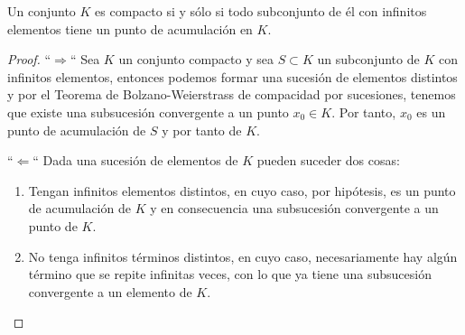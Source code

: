 \begin{teorema}
    Un conjunto $K$ es compacto si y sólo si todo subconjunto de él con infinitos elementos tiene un punto de acumulación en $K$.
\end{teorema}
\begin{proof}
    ``$\Rightarrow$``
    Sea $K$ un conjunto compacto y sea $S \subset K$ un subconjunto de $K$ con infinitos elementos, entonces podemos formar una sucesión de elementos distintos y por el Teorema de Bolzano-Weierstrass de compacidad por sucesiones, tenemos que existe una subsucesión convergente a un punto $x_0 \in K$. Por tanto, $x_0$ es un punto de acumulación de $S$ y por tanto de $K$.

    ``$\Leftarrow$``
    Dada una sucesión de elementos de $K$ pueden suceder dos cosas:
    \begin{enumerate}
        \item Tengan infinitos elementos distintos, en cuyo caso, por hipótesis, es un punto de acumulación de $K$ y en consecuencia una subsucesión convergente a un punto de $K$. 
        \item No tenga infinitos términos distintos, en cuyo caso, necesariamente hay algún término que se repite infinitas veces, con lo que ya tiene una subsucesión convergente a un elemento de $K$. 
    \end{enumerate}
\end{proof}

